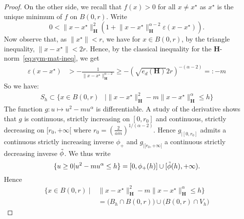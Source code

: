 \begin{proof}
On the other side, we recall that $f(x)>0$ for all $x\neq x^{\star}$
as $x^{\star}$ is the unique minimum of $f$ on $B(0,r)$. Write
\[
0<\lVert x-x^{\star}\rVert_{\mathbf{H}}^{2}(1+\lVert x-x^{\star}\rVert_{\mathbf{H}}^{\alpha-2}\varepsilon(x-x^{\star})).
\]
Now observe that, as $\lVert x^{\star}\rVert<r$, we have for $x\in B(0,r)$,
by the triangle inequality, $\lVert x-x^{\star}\rVert<2r$. Hence,
by the classical inequality for the $\mathbf{H}$-norm~\eqref{eq:sym-mat-ineq}, we get
\begin{align*}
\varepsilon(x-x^{\star}) & >-\frac{1}{\lVert x-x^{\star}\rVert_{\mathbf{H}}^{\alpha-2}}\geq-\left(\sqrt{e_{d}(\mathbf{H})}2r\right)^{-(\alpha-2)}=:-m
\end{align*}
So we have: 
\begin{align*}
S_{h}\subset\{x\in B(0,r) & \mid\lVert x-x^{\star}\rVert_{\mathbf{H}}^{2}-m\lVert x-x^{\star}\rVert_{\mathbf{H}}^{\alpha}\leq h\}
\end{align*}
The function $g\colon u\mapsto u^{2}-mu^{\alpha}$ is differentiable.
A study of the derivative shows that $g$ is continuous, strictly
increasing on $[0,r_{0}]$ and continuous, strictly decreasing on
$[r_{0},+\infty[$ where $r_{0}=(\frac{2}{\alpha m})^{1/(\alpha-2)}$.
Hence $g_{|[0,r_{0}]}$ admits a continuous strictly increasing inverse
$\phi_{+}$ and $g_{|[r_{0},+\infty[}$ a continuous strictly decreasing
inverse $\Tilde{\phi}$. We thus write 
\[
\{u\ge0|u^{2}-mu^{\alpha}\le h\}=[0,\phi_{+}(h)]\cup[\Tilde{\phi}(h),+\infty).
\]
Hence 
\begin{align*}
 \{x\in B(0,r)\mid&\lVert x-x^{\star}\rVert_{\mathbf{H}}^{2}-m\lVert x-x^{\star}\rVert_{\mathbf{H}}^{\alpha}\leq h\}\\
&=\big(B_{h}\cap B(0,r)\big)\cup\big(B(0,r)\cap V_{h}\big)
\end{align*}


\end{proof}
